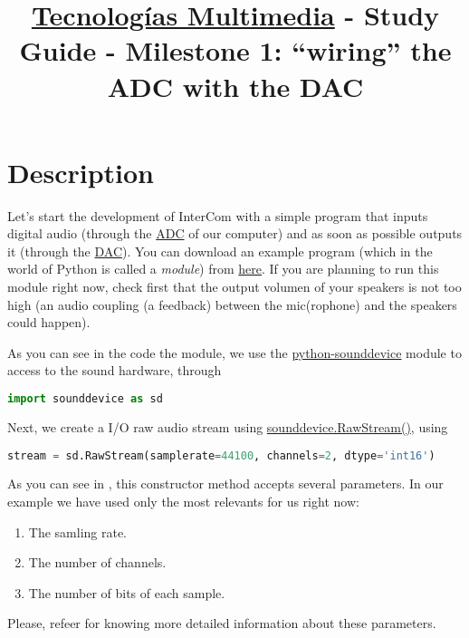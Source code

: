 \title{\href{https://www.ual.es/estudios/grados/presentacion/plandeestudios/asignatura/4015/40154321?idioma=zh_CN}{Tecnologías Multimedia} - Study Guide - Milestone 1: ``wiring'' the ADC with the DAC}

\maketitle

\section{Description}

Let's start the development of InterCom with a simple program that
inputs digital audio (through
the \href{https://en.wikipedia.org/wiki/Analog-to-digital_converter}{ADC}
of our computer) and as soon as possible outputs it (through
the \href{https://en.wikipedia.org/wiki/Digital-to-analog_converter}{DAC}). You
can download an example program (which in the world of Python is
called a \emph{module})
from \href{https://github.com/Tecnologias-multimedia/intercom/blob/master/test/sounddevice/wire3.py}{here}. If
you are planning to run this module right now, check first that the
output volumen of your speakers is not too high (an audio coupling (a
feedback) between the mic(rophone) and the speakers could happen).

As you can see in the code the module, we use the
\href{https://python-sounddevice.readthedocs.io/en/latest/}{python-sounddevice}
\cite{sounddevice} module to access to the sound hardware, through
\begin{lstlisting}[language=Python]
import sounddevice as sd
\end{lstlisting}

Next, we create a I/O raw audio stream
using \href{https://python-sounddevice.readthedocs.io/en/latest/api/raw-streams.html#sounddevice.RawStream}{sounddevice.RawStream()}, using
\begin{lstlisting}[language=Python]
stream = sd.RawStream(samplerate=44100, channels=2, dtype='int16')
\end{lstlisting}

As you can see in \cite{sounddevice}, this constructor method accepts
several parameters. In our example we have used only the most
relevants for us right now:
\begin{enumerate}
\item The samling rate.
\item The number of channels.
\item The number of bits of each sample.
\end{enumerate}
Please, refeer \cite{harmonic-analysis} for knowing more detailed
information about these parameters.

